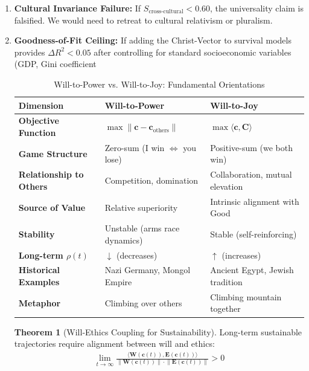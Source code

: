 \documentclass[11pt,a4paper]{article}
\theoremstyle{definition}
\newtheorem{theorem}{Theorem}[section]
\theoremstyle{remark}
\newcommand{\EE}{\mathbf{E}}
\newcommand{\WW}{\mathbf{W}}
\newcommand{\cc}{\mathbf{c}}
\newcommand{\norm}[1]{\left\|#1\right\|}
\begin{document}
\begin{small}
\begin{enumerate}
    \item \textbf{Cultural Invariance Failure:} If \(S_{\text{cross-cultural}} < 0.60\), the universality claim is falsified. We would need to retreat to cultural relativism or pluralism.
    
    \item \textbf{Goodness-of-Fit Ceiling:} If adding the Christ-Vector to survival models provides \(\Delta R^2 < 0.05\) after controlling for standard socioeconomic variables (GDP, Gini coefficient



\begin{table}[H]
\centering
\caption{Will-to-Power vs. Will-to-Joy: Fundamental Orientations}
\label{tab:will_comparison}
\begin{tabular}{|p{4cm}|p{5cm}|p{5cm}|}
\hline
\textbf{Dimension} & \textbf{Will-to-Power} & \textbf{Will-to-Joy} \\
\hline
\textbf{Objective Function} & \(\max \|\cc - \cc_{\text{others}}\|\) & \(\max \langle \cc, \mathbf{C} \rangle\) \\
\hline
\textbf{Game Structure} & Zero-sum (I win \(\iff\) you lose) & Positive-sum (we both win) \\
\hline
\textbf{Relationship to Others} & Competition, domination & Collaboration, mutual elevation \\
\hline
\textbf{Source of Value} & Relative superiority & Intrinsic alignment with Good \\
\hline
\textbf{Stability} & Unstable (arms race dynamics) & Stable (self-reinforcing) \\
\hline
\textbf{Long-term \(\rho(t)\)} & \(\downarrow\) (decreases) & \(\uparrow\) (increases) \\
\hline
\textbf{Historical Examples} & Nazi Germany, Mongol Empire & Ancient Egypt, Jewish tradition \\
\hline
\textbf{Metaphor} & Climbing over others & Climbing mountain together \\
\hline
\end{tabular}
\end{table}

\begin{theorem}[Will-Ethics Coupling for Sustainability]
Long-term sustainable trajectories require alignment between will and ethics:
\begin{align}
\lim_{t \to \infty} \frac{\langle \WW(\cc(t)), \EE(\cc(t)) \rangle}{\norm{\WW(\cc(t))} \cdot \norm{\EE(\cc(t))}} > 0
\end{align}


\end{theorem}
\end{enumerate}
\end{small}
\end{document}
